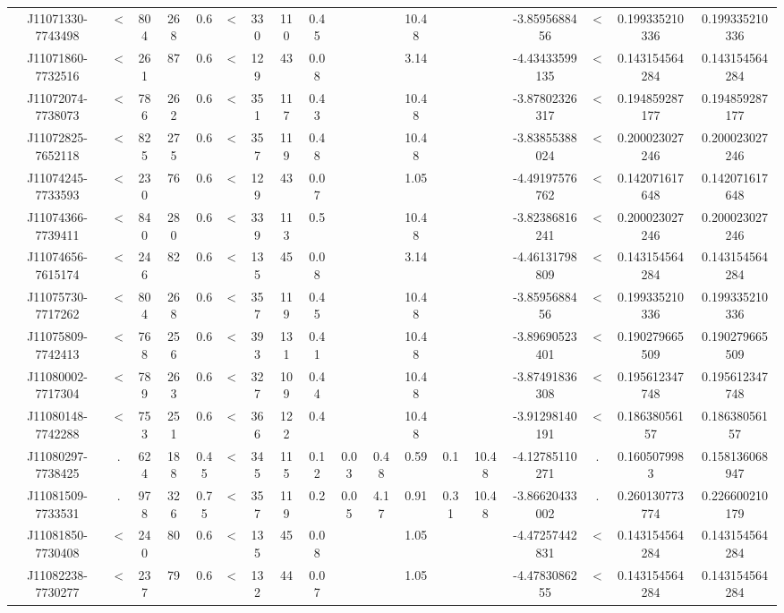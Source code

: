 \begin{table}
\begin{tabular}{cccccccccccccccccc}
J11071330-7743498 & < & 804 & 268 & 0.6 & < & 330 & 110 & 0.45 &  &  & 10.48 &  &  & -3.8595688456 & < & 0.199335210336 & 0.199335210336 \\
J11071860-7732516 & < & 261 & 87 & 0.6 & < & 129 & 43 & 0.08 &  &  & 3.14 &  &  & -4.43433599135 & < & 0.143154564284 & 0.143154564284 \\
J11072074-7738073 & < & 786 & 262 & 0.6 & < & 351 & 117 & 0.43 &  &  & 10.48 &  &  & -3.87802326317 & < & 0.194859287177 & 0.194859287177 \\
J11072825-7652118 & < & 825 & 275 & 0.6 & < & 357 & 119 & 0.48 &  &  & 10.48 &  &  & -3.83855388024 & < & 0.200023027246 & 0.200023027246 \\
J11074245-7733593 & < & 230 & 76 & 0.6 & < & 129 & 43 & 0.07 &  &  & 1.05 &  &  & -4.49197576762 & < & 0.142071617648 & 0.142071617648 \\
J11074366-7739411 & < & 840 & 280 & 0.6 & < & 339 & 113 & 0.5 &  &  & 10.48 &  &  & -3.82386816241 & < & 0.200023027246 & 0.200023027246 \\
J11074656-7615174 & < & 246 & 82 & 0.6 & < & 135 & 45 & 0.08 &  &  & 3.14 &  &  & -4.46131798809 & < & 0.143154564284 & 0.143154564284 \\
J11075730-7717262 & < & 804 & 268 & 0.6 & < & 357 & 119 & 0.45 &  &  & 10.48 &  &  & -3.8595688456 & < & 0.199335210336 & 0.199335210336 \\
J11075809-7742413 & < & 768 & 256 & 0.6 & < & 393 & 131 & 0.41 &  &  & 10.48 &  &  & -3.89690523401 & < & 0.190279665509 & 0.190279665509 \\
J11080002-7717304 & < & 789 & 263 & 0.6 & < & 327 & 109 & 0.44 &  &  & 10.48 &  &  & -3.87491836308 & < & 0.195612347748 & 0.195612347748 \\
J11080148-7742288 & < & 753 & 251 & 0.6 & < & 366 & 122 & 0.4 &  &  & 10.48 &  &  & -3.91298140191 & < & 0.18638056157 & 0.18638056157 \\
J11080297-7738425 & . & 624 & 188 & 0.45 & < & 345 & 115 & 0.12 & 0.03 & 0.48 & 0.59 & 0.1 & 10.48 & -4.12785110271 & . & 0.1605079983 & 0.158136068947 \\
J11081509-7733531 & . & 978 & 326 & 0.75 & < & 357 & 119 & 0.2 & 0.05 & 4.17 & 0.91 & 0.31 & 10.48 & -3.86620433002 & . & 0.260130773774 & 0.226600210179 \\
J11081850-7730408 & < & 240 & 80 & 0.6 & < & 135 & 45 & 0.08 &  &  & 1.05 &  &  & -4.47257442831 & < & 0.143154564284 & 0.143154564284 \\
J11082238-7730277 & < & 237 & 79 & 0.6 & < & 132 & 44 & 0.07 &  &  & 1.05 &  &  & -4.4783086255 & < & 0.143154564284 & 0.143154564284 \\

\end{tabular}
\end{table}
